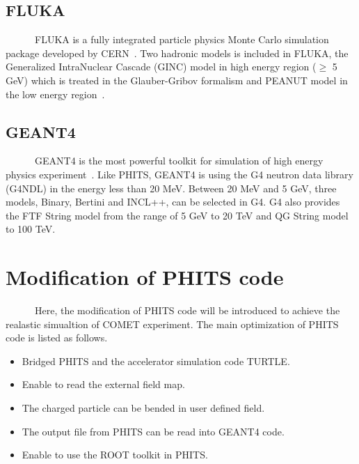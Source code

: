   \subsection{FLUKA}
~~~~~~FLUKA is a fully integrated particle physics Monte Carlo simulation package developed by CERN~\cite{fluka}.
Two hadronic models is included in FLUKA, the Generalized IntraNuclear Cascade (GINC) model in high energy region ($\ge$ 5 GeV) which is treated in the Glauber-Gribov formalism and PEANUT model in the low energy region~\cite{fluka2}.

  \subsection{GEANT4}
~~~~~~GEANT4 is the most powerful toolkit for simulation of high energy physics experiment~\cite{geant4}.
Like PHITS, GEANT4 is using the G4 neutron data library (G4NDL) in the energy less than 20 MeV.
Between 20 MeV and 5 GeV, three models, Binary, Bertini and INCL++, can be selected in G4.
G4 also provides the FTF String model from the range of 5 GeV to 20 TeV and QG String model to 100 TeV.

 \section{Modification of PHITS code}
~~~~~~Here, the modification of PHITS code will be introduced to achieve the realastic simualtion of COMET experiment.
The main optimization of PHITS code is listed as follows.
\begin{itemize}
 \setlength{\itemsep}{-5pt}
 \item Bridged PHITS and the accelerator simulation code TURTLE.
 \item Enable to read the external field map.
 \item The charged particle can be bended in user defined field.
 \item The output file from PHITS can be read into GEANT4 code.
 \item Enable to use the ROOT toolkit in PHITS.
\end{itemize}

